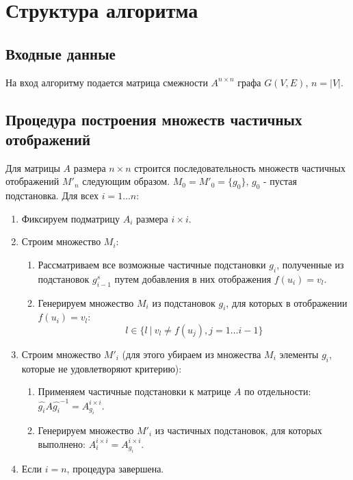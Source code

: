 \section{Структура алгоритма}
\label{sec:AlgoStruct_3} 
\large

\subsection{Входные данные}

На вход алгоритму подается матрица смежности $A^{n \times n}$ графа $G(V,E)$, $n = |V|$.

\subsection{Процедура построения множеств частичных отображений}

Для матрицы $A$ размера $n \times n$ строится последовательность множеств частичных отображений ${M'_n}$ следующим образом. $M_0 = M'_0 = \{g_0\}$, $g_0$ - пустая подстановка. Для всех $i = 1 \ldots n$:
\begin{enumerate}
\item Фиксируем подматрицу $A_i$ размера $i \times i$.

\item Строим множество $M_i$:
\begin{enumerate}
\item Рассматриваем все возможные частичные подстановки $g_i$, полученные из подстановок $g^s_{i-1}$ путем добавления в них отображения $f(u_i) = v_l$.
\item Генерируем множество $M_i$ из подстановок $g_i$, для которых в отображении $f(u_i) = v_l$:
$$l \in \{l\ |\ v_l \neq f(u_j), j = 1 \ldots i-1\}$$
\end{enumerate}

\item Строим множество $M'_i$ (для этого убираем из множества $M_i$ элементы $g_i$, которые не удовлетворяют критерию):
\begin{enumerate}
\item Применяем частичные подстановки к матрице $A$ по отдельности: $\widehat{g_i}A\widehat{g_i}^{-1} = A^{i \times i}_{g_i}$.
\item Генерируем множество $M'_i$ из частичных подстановок, для которых выполнено: $A^{i \times i}_{i} = A^{i \times i}_{g_i}$.
\end{enumerate}

\item Если $i = n$, процедура завершена.
\end{enumerate}



